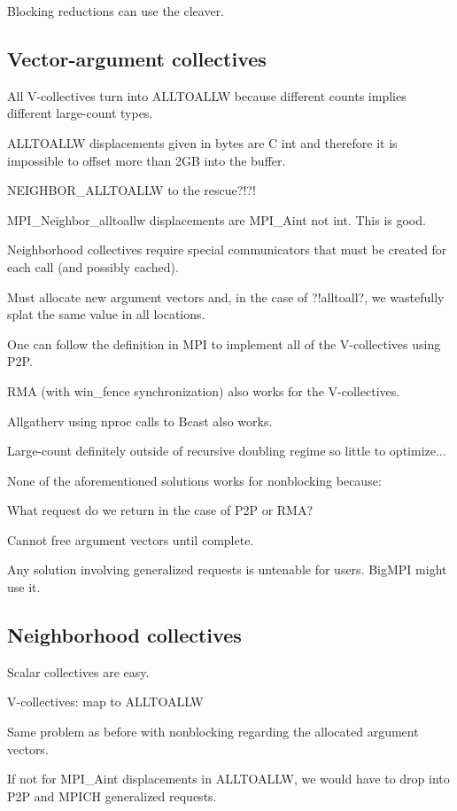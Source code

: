 Blocking reductions can use the cleaver.

\subsection{Vector-argument collectives}

All V-collectives turn into ALLTOALLW because different counts implies different large-count types.

ALLTOALLW displacements given in bytes are C int and therefore it is impossible to offset more than 2GB into the buffer.

NEIGHBOR\_ALLTOALLW to the rescue?!?!

MPI\_Neighbor\_alltoallw displacements are MPI\_Aint not int.  This is good.

Neighborhood collectives require special communicators that must be created for each call (and possibly cached).

Must allocate new argument vectors and, in the case of ?!alltoall?, we wastefully splat the same value in all locations.


One can follow the definition in MPI to implement all of the V-collectives using P2P.

RMA (with win\_fence synchronization) also works for the V-collectives.

Allgatherv using nproc calls to Bcast also works.

Large-count definitely outside of recursive doubling regime so little to optimize...


None of the aforementioned solutions works for nonblocking because:

What request do we return in the case of P2P or RMA?

Cannot free argument vectors until complete.

Any solution involving generalized requests is untenable for users.  BigMPI might use it.

\subsection{Neighborhood collectives}

Scalar collectives are easy.

V-collectives: map to ALLTOALLW

Same problem as before with nonblocking regarding the allocated argument vectors.

If not for MPI\_Aint displacements in ALLTOALLW, we would have to drop into P2P and MPICH generalized requests.
